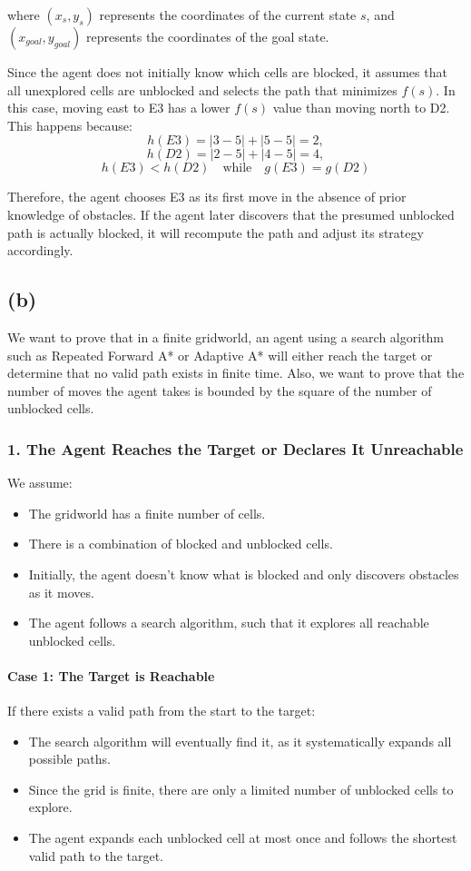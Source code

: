 \documentclass{article}
\begin{document}
where \( (x_s, y_s) \) represents the coordinates of the current state \( s \), and \( (x_{goal}, y_{goal}) \) represents the coordinates of the goal state.

Since the agent does not initially know which cells are blocked, it assumes that all unexplored cells are unblocked and selects the path that minimizes \( f(s) \). In this case, moving east to E3 has a lower \( f(s) \) value than moving north to D2. This happens because:
\[h(E3) = |3-5| + |5-5| = 2,\]
\[h(D2) = |2-5| + |4-5| = 4,\]
\[h(E3) < h(D2) \quad \text{while} \quad g(E3) = g(D2)\]


Therefore, the agent chooses E3 as its first move in the absence of prior knowledge of obstacles. If the agent later discovers that the presumed unblocked path is actually blocked, it will recompute the path and adjust its strategy accordingly.

\subsection*{(b)}

We want to prove that in a finite gridworld, an agent using a search algorithm such as Repeated Forward A* or Adaptive A* will either reach the target or determine that no valid path exists in finite time. Also, we want to prove that the number of moves the agent takes is bounded by the square of the number of unblocked cells.

\subsubsection*{1. The Agent Reaches the Target or Declares It Unreachable}

We assume:
\begin{itemize}
    \item The gridworld has a finite number of cells.
    \item There is a combination of blocked and unblocked cells.
    \item Initially, the agent doesn't know what is blocked and only discovers obstacles as it moves.
    \item The agent follows a search algorithm, such that it explores all reachable unblocked cells.
\end{itemize}

\paragraph{Case 1: The Target is Reachable}
If there exists a valid path from the start to the target:
\begin{itemize}
    \item The search algorithm will eventually find it, as it systematically expands all possible paths.
    \item Since the grid is finite, there are only a limited number of unblocked cells to explore.
    \item The agent expands each unblocked cell at most once and follows the shortest valid path to the target.
\end{itemize}
\end{document}
